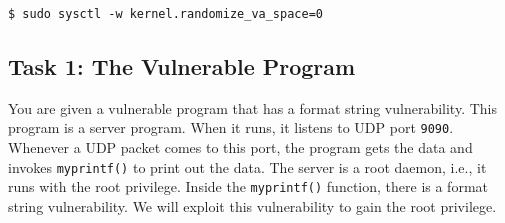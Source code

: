 \begin{lstlisting}
$ sudo sysctl -w kernel.randomize_va_space=0
\end{lstlisting}


\subsection{Task 1: The Vulnerable Program}

You are given a vulnerable program that has a format string vulnerability.
This program is a server program. When it runs, it listens to UDP port
\texttt{9090}. Whenever a UDP packet comes to this port, the program
gets the data and invokes \texttt{myprintf()} to print out the data. 
The server is a root daemon, i.e., it runs with the root privilege. 
Inside the \texttt{myprintf()} function, there is a format string
vulnerability. We will exploit this vulnerability to gain the root
privilege.  

